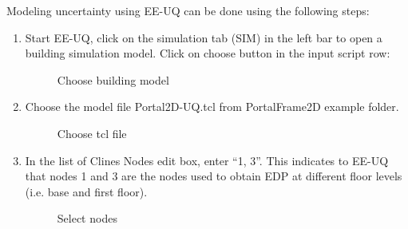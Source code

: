 Modeling uncertainty using EE-UQ can be done using the following steps:
\begin{enumerate}
\item	 Start EE-UQ, click on the simulation tab (SIM) in the left bar to open a building simulation model. Click on choose button in the input script row:

\begin{figure}[!htbp]
  \caption{Choose building model}
  \label{fig:figure21}
\end{figure}

\item	 Choose the model file Portal2D-UQ.tcl from PortalFrame2D example folder.
\begin{figure}[!htbp]
  \caption{Choose tcl file}
  \label{fig:figure22}
\end{figure}


\item	 In the list of Clines Nodes edit box, enter “1, 3”. This indicates to EE-UQ that nodes 1 and 3 are the nodes used to obtain EDP at different floor levels (i.e. base and first floor).
\begin{figure}[!htbp]
  \caption{Select nodes}
  \label{fig:figure23}
\end{figure}


\end{enumerate}
